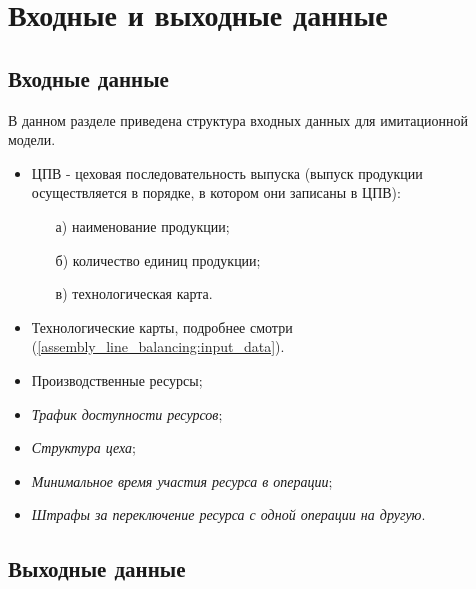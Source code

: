 \section{Входные и выходные данные}

\subsection{Входные данные}
В данном разделе приведена структура входных данных для имитационной модели.

\begin{itemize}
	\item ЦПВ - цеховая последовательность выпуска (выпуск продукции осуществляется в порядке, в котором они записаны в ЦПВ):
		\begin{itemize}
			\item[а)] наименование продукции;
			\item[б)] количество единиц продукции;	
			\item[в)] технологическая карта.
		\end{itemize}			
	\item Технологические карты, подробнее смотри (\ref{assembly_line_balancing:input_data}).
	\item Производственные ресурсы;
	\item \textit{Трафик доступности ресурсов};
	\item \textit{Структура цеха};
	\item \textit{Минимальное время участия ресурса в операции};
	\item \textit{Штрафы за переключение ресурса с одной операции на другую}. 
\end{itemize}

\subsection{Выходные данные}

